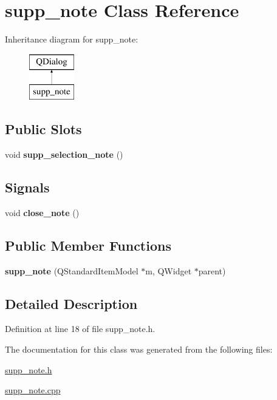\hypertarget{classsupp__note}{}\section{supp\+\_\+note Class Reference}
\label{classsupp__note}
Inheritance diagram for supp\+\_\+note\+:\begin{figure}[H]
\begin{center}
\leavevmode
\includegraphics[height=2.000000cm]{classsupp__note}
\end{center}
\end{figure}
\subsection*{Public Slots}
\begin{DoxyCompactItemize}
\item 
\mbox{\label{classsupp__note_a5dbf6d3af5c94d71f42eeb2cf626c9d3}} 
void {\bfseries supp\+\_\+selection\+\_\+note} ()
\end{DoxyCompactItemize}
\subsection*{Signals}
\begin{DoxyCompactItemize}
\item 
\mbox{\label{classsupp__note_a0a45d0adbe61d17cb5d088103955da7c}} 
void {\bfseries close\+\_\+note} ()
\end{DoxyCompactItemize}
\subsection*{Public Member Functions}
\begin{DoxyCompactItemize}
\item 
\mbox{\label{classsupp__note_a0a8f0c351866f8026cabfd981b919889}} 
{\bfseries supp\+\_\+note} (Q\+Standard\+Item\+Model $\ast$m, Q\+Widget $\ast$parent)
\end{DoxyCompactItemize}


\subsection{Detailed Description}


Definition at line 18 of file supp\+\_\+note.\+h.



The documentation for this class was generated from the following files\+:\begin{DoxyCompactItemize}
\item 
\hyperlink{supp__note_8h}{supp\+\_\+note.\+h}\item 
\hyperlink{supp__note_8cpp}{supp\+\_\+note.\+cpp}\end{DoxyCompactItemize}
